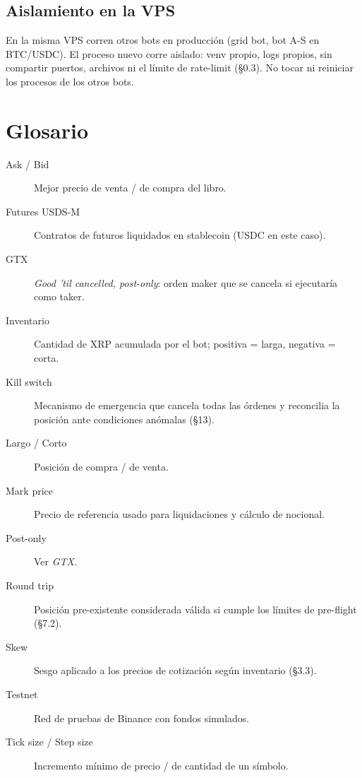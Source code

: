 \documentclass[11pt,a4paper]{article}
\begin{document}
\subsection{Aislamiento en la VPS}
En la misma VPS corren otros bots en producción (grid bot, bot A-S en
BTC/USDC). El proceso nuevo corre aislado: venv propio, logs propios,
sin compartir puertos, archivos ni el límite de rate-limit (§0.3). No
tocar ni reiniciar los procesos de los otros bots.

\appendix
\section{Glosario}

\begin{description}
  \item[Ask / Bid] Mejor precio de venta / de compra del libro.
  \item[Futures USDS-M] Contratos de futuros liquidados en stablecoin
  (USDC en este caso).
  \item[GTX] \emph{Good 'til cancelled, post-only}: orden maker que se
  cancela si ejecutaría como taker.
  \item[Inventario] Cantidad de XRP acumulada por el bot; positiva =
  larga, negativa = corta.
  \item[Kill switch] Mecanismo de emergencia que cancela todas las
  órdenes y reconcilia la posición ante condiciones anómalas (§13).
  \item[Largo / Corto] Posición de compra / de venta.
  \item[Mark price] Precio de referencia usado para liquidaciones y
  cálculo de nocional.
  \item[Post-only] Ver \emph{GTX}.
  \item[Round trip] Posición pre-existente considerada válida si
  cumple los límites de pre-flight (§7.2).
  \item[Skew] Sesgo aplicado a los precios de cotización según
  inventario (§3.3).
  \item[Testnet] Red de pruebas de Binance con fondos simulados.
  \item[Tick size / Step size] Incremento mínimo de precio / de
  cantidad de un símbolo.
\end{description}

\end{document}
